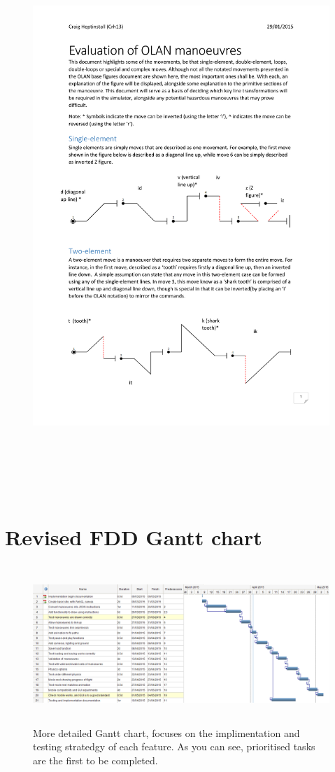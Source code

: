 \begin{figure}[h!]
	\centering
	\includegraphics[width=16cm,height=21cm,page=5]{images/eval.pdf}
\end{figure}
\clearpage

\section{Revised FDD Gantt chart}
\label{app:gantt2}
\begin{landscape}
\begin{figure}[h!]
  \centering
  	\caption{More detailed Gantt chart, focuses on the implimentation and testing stratedgy of each feature. As you can see, prioritised tasks are the first to be completed.}
      \includegraphics[width=23cm, height=6cm]{images/second.png}
\end{figure}
\end{landscape}
\clearpage